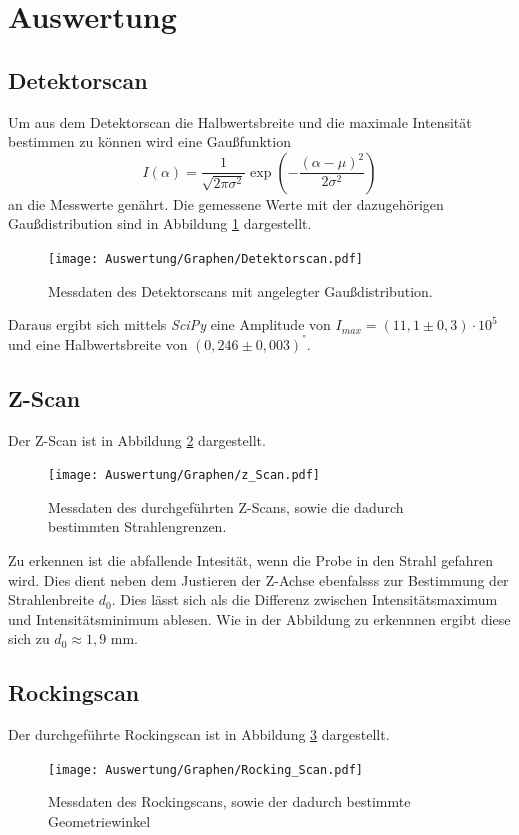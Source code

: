 \section{Auswertung}
\label{sec:Auswertung}

\subsection{Detektorscan}
 Um aus dem Detektorscan die Halbwertsbreite 
 und die maximale Intensität bestimmen zu können wird eine Gaußfunktion
 \begin{equation}
     I(\alpha) = \frac{1}{\sqrt{2\pi \sigma^2}}\exp\left(-\frac{(\alpha - \mu)^2}{2\sigma^2}\right)
 \end{equation} 
an die Messwerte genährt.
Die gemessene Werte mit der dazugehörigen Gaußdistribution sind in Abbildung \ref{fig:gauß} dargestellt.
\begin{figure}[ht]
    \centering
    \texttt{[image: Auswertung/Graphen/Detektorscan.pdf]}
    \caption{Messdaten des Detektorscans mit angelegter Gaußdistribution.}
    \label{fig:gauß}
\end{figure}
Daraus ergibt sich mittels \textit{SciPy} \cite{scipy} eine Amplitude  von $I_{max} =(11,1\pm 0,3) \cdot 10^5$ 
und eine Halbwertsbreite von $(0,246 \pm 0,003)^°$.



\subsection{Z-Scan}
Der Z-Scan ist in Abbildung \ref{fig:Z} dargestellt.
\begin{figure}[h]
    \centering
    \texttt{[image: Auswertung/Graphen/z\_Scan.pdf]}
    \caption{Messdaten des durchgeführten Z-Scans, sowie die dadurch bestimmten Strahlengrenzen.}
    \label{fig:Z}
\end{figure}
Zu erkennen ist die abfallende Intesität, wenn die Probe in den Strahl gefahren wird.
Dies dient neben dem Justieren der Z-Achse ebenfalsss zur Bestimmung der Strahlenbreite $d_0$.
Dies lässt sich als die Differenz zwischen Intensitätsmaximum und Intensitätsminimum ablesen.
Wie in der Abbildung zu erkennnen ergibt diese sich zu $d_0 \approx 1,9$ mm.



\subsection{Rockingscan}
Der durchgeführte Rockingscan ist in Abbildung \ref{fig:roc} dargestellt.
\begin{figure}[h]
    \centering
    \texttt{[image: Auswertung/Graphen/Rocking\_Scan.pdf]}
    \caption{Messdaten des Rockingscans, sowie der dadurch bestimmte Geometriewinkel}
    \label{fig:roc}
\end{figure}

